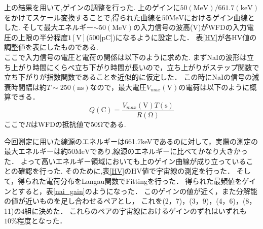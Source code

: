 上の結果を用いて,ゲインの調整を行った.
上のゲインに$50(\mathrm{MeV})/661.7(\mathrm{keV})$をかけてスケール変換することで,得られた曲線を$50\mathrm{MeV}$におけるゲイン曲線とした.
そして最大エネルギー$\sim 50(\mathrm{MeV})$の入力信号の波高($\mathrm{V}$)がWFDの入力電圧の上限の半分程度$1[\mathrm{V}]$($500[\mathrm{pC}$])になるように設定した．
表\ref{HV}が各HV値の調整値を表にしたものである.\\
ここで入力信号の電圧と電荷の関係は以下のように求めた.
まずNaIの波形は立ち上がり時間にくらべ立ち下がり時間が長いので，立ち上がりがステップ関数で立ち下がりが指数関数であることを近似的に仮定した．
この時にNaIの信号の減衰時間幅は約$T\sim 250(\mathrm{ns})$なので，最大電圧$V_{max}(\mathrm{V})$の電荷は以下のように概算できる．
\begin{equation}
Q(\mathrm{C}) = \frac{V_{max}(\mathrm{V})T(\mathrm{s})}{R(\mathrm{\Omega})}
\end{equation}
ここで$R$はWFDの抵抗値で$50\mathrm{\Omega}$である.

今回測定に用いた線源のエネルギーは661.7keVであるのに対して，実際の測定の最大エネルギーは約$50\mathrm{MeV}$であり,線源のエネルギーに比べてかなり大きかった．
よって高いエネルギー領域においても上のゲイン曲線が成り立っていることの確認を行った.
そのために,表\ref{HV}のHV値で宇宙線の測定を行った．
そして，得られた電荷分布をLangau関数でFittingを行った．
得られた最頻値をゲインとすると，表\ref{nai_gain}のようになった．
このゲインの値が近く，また分解能の値が近いものを足し合わせるペアとし，
これを(2，7)，(3，9)，(4，6)，(8，11)の4組に決めた．
これらのペアの宇宙線におけるゲインのずれはいずれも$10\%$程度となった．

